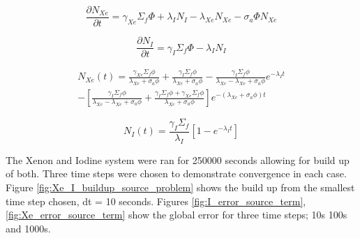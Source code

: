 \begin{equation}
    \frac{\partial N_{Xe}}{\partial t} = \gamma_{Xe}\Sigma_{f}\Phi + \lambda_{I}N_{I} - \lambda_{Xe}N_{Xe} - \sigma_{a}\Phi N_{Xe}
    \label{eq:XenonGeneralDiffEqSource}
\end{equation}

\begin{equation}
    \frac{\partial N_{I}}{\partial t} = \gamma_{I}\Sigma_{f}\Phi - \lambda_{I}N_{I}
    \label{eq:IodineGeneralDiffEqSource}
\end{equation}

\begin{equation}
\begin{split}
   N_{Xe}(t)  =\frac{\gamma_{Xe}\Sigma_{f}\phi}{\lambda_{Xe} + 
   \sigma_{a}\phi} + \frac{\gamma_{I}\Sigma_{f}\phi}{\lambda_{Xe} + 
   \sigma_{a}\phi} - \frac{\gamma_{I}\Sigma_{f}\phi}{\lambda_{Xe} - 
   \lambda_{Xe} + \sigma_{a}\phi}e^{-\lambda_{I}t} \\
   - \left[\frac{\gamma_{I}\Sigma_{f}\phi}{\lambda_{Xe} - \lambda_{Xe} +
   \sigma_{a}\phi} + \frac{\gamma_{I}\Sigma_{f}\phi + \gamma_{Xe}\Sigma_{f}\phi}{\lambda_{Xe} + 
   \sigma_{a}\phi} \right]e^{-(\lambda_{Xe} + \sigma_{a}\phi)t}
\end{split}
\end{equation}

\begin{equation}
   N_{I}(t)  =\frac{\gamma_{I}\Sigma_{f}}{\lambda_{I}} \left[1 - e^{-\lambda_{I}t} \right]
   \label{eq:number_density_iodine_time}
\end{equation}

The Xenon and Iodine system were ran for 250000 seconds allowing for build up of both. Three time steps were chosen to demonstrate convergence in each case. Figure \ref{fig:Xe_I_buildup_source_problem} shows the build up from the smallest time step chosen, dt = 10 seconds. Figures \ref{fig:I_error_source_term}, \ref{fig:Xe_error_source_term} show the global error for three time steps; 10s 100s and 1000s. 

\vspace{12.7mm} %

